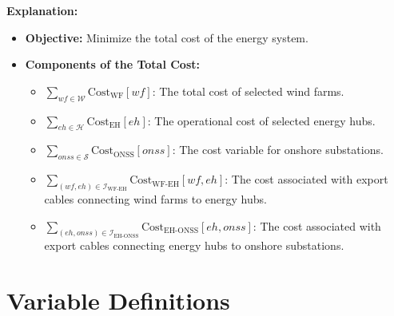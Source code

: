 \textbf{Explanation:}
\begin{itemize}
    \item \textbf{Objective:} Minimize the total cost of the energy system.
    \item \textbf{Components of the Total Cost:}
    \begin{itemize}
        \item \( \sum_{wf \in \mathcal{W}} \text{Cost}_{\text{WF}}[wf] \): The total cost of selected wind farms.
        \item \( \sum_{eh \in \mathcal{H}} \text{Cost}_{\text{EH}}[eh] \): The operational cost of selected energy hubs.
        \item \( \sum_{onss \in \mathcal{S}} \text{Cost}_{\text{ONSS}}[onss] \): The cost variable for onshore substations.
        \item \( \sum_{(wf, eh) \in \mathcal{I}_{\text{WF-EH}}} \text{Cost}_{\text{WF-EH}}[wf, eh] \): The cost associated with export cables connecting wind farms to energy hubs.
        \item \( \sum_{(eh, onss) \in \mathcal{I}_{\text{EH-ONSS}}} \text{Cost}_{\text{EH-ONSS}}[eh, onss] \): The cost associated with export cables connecting energy hubs to onshore substations.
    \end{itemize}
\end{itemize}


\section*{Variable Definitions}

